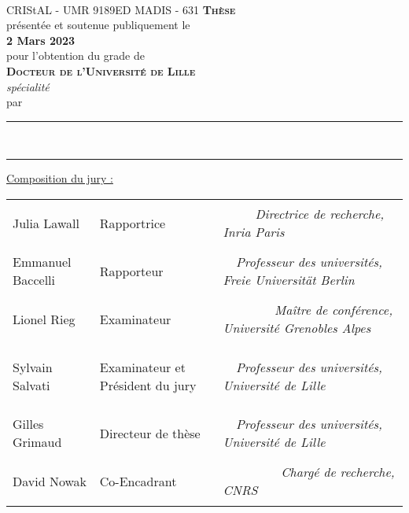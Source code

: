 \begin{titlepage}
    \sffamily
    \begin{center}
	{
        	\def\svgwidth{20 em}
		\\
		{\tiny{CRIStAL - UMR 9189}\hfil{ED MADIS - 631}}
	}
        \vfil
	{
		{
			{\Huge{\textsc{\textbf{Thèse}}}}
		}\\[1 em]
		{
			{présentée et soutenue publiquement le}\\
			{\textbf{2 Mars 2023}}
		}\\[1 em]
		{
			{pour l'obtention du grade de}\\
			{\LARGE{\textsc{\textbf{Docteur de l'Université de Lille}}}}\\
			{\large\textit{spécialité \printProgram}}
		}\\[1 em]
		{
			{par}\\[0.3 em]
			{\Large\textbf{\printAuthor}}
		}
	}
        \vfil
        {\LARGE
            \rule[1 ex]{\textwidth}{1.5 pt}
            \onehalfspacing\printTitleBold\\[1 ex]
            \rule[-1 ex]{\textwidth}{1.5 pt}
        }
    \end{center}
    
    \vfil
	{\small \centering \underline{Composition du jury :}}
    \begin{table}[h]
	\small
        \sffamily 
        {%
	    \begin{tabular}{
		>{\raggedright\arraybackslash}p{}
		>{\bfseries\raggedright\arraybackslash}p{}%
		>{\itshape\raggedleft\arraybackslash}p{}
	    }
		Julia Lawall		& Rapportrice				& ~~~~~Directrice de recherche, Inria Paris\\
		Emmanuel Baccelli	& Rapporteur				& ~~Professeur des universités, Freie Universität Berlin\\
		Lionel Rieg		& Examinateur				& ~~~~~~~~Maître de conférence, Université Grenobles Alpes\\
		Sylvain Salvati		& Examinateur et Président du jury	& ~~Professeur des universités, Université de Lille\\
		Gilles Grimaud		& Directeur de thèse			& ~~Professeur des universités, Université de Lille\\
		David Nowak		& Co-Encadrant				& ~~~~~~~~~Chargé de recherche, CNRS\\
            \end{tabular}
        }
    \end{table}
\end{titlepage}

\restoregeometry
